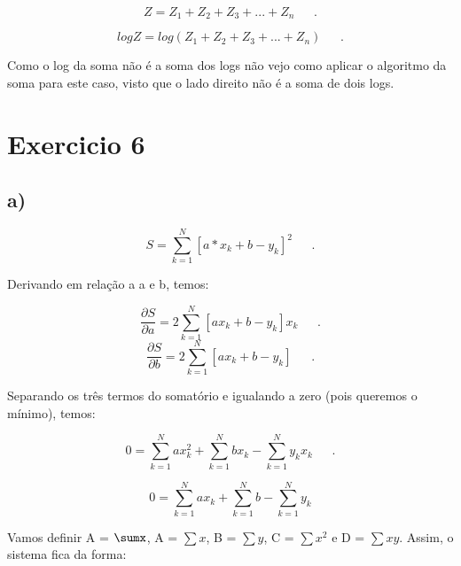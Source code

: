 \documentclass[a4wide]{report}
\begin{document}
\begin{equation}
Z = Z_{1} + Z_{2} + Z_{3} + ... + Z_{n}
~~~~~~~.
\label{z}
\end{equation}

\begin{equation}
logZ = log (Z_{1} + Z_{2} + Z_{3} + ... + Z_{n} )
~~~~~~~.
\label{z2}
\end{equation}

Como o log da soma não é a soma dos logs não vejo como aplicar o algoritmo da soma para este caso, visto que o lado direito não é a soma de dois logs.
	
\section*{Exercicio 6}
\subsection*{a)}

\begin{equation}
S = \sum_{k=1}^{N}  [a*x_{k} + b - y_{k}]^2
~~~~~~~.
\label{regressao}
\end{equation}
	
Derivando em relação a a e b, temos:

	\begin{equation}
\frac{\partial S}{\partial a} = 2\sum_{k=1}^{N}  [ax_{k} + b - y_{k}]x_{k}
~~~~~~~.
\label{dsda}
\end{equation}
	\begin{equation}
\frac{\partial S}{\partial b} = 2\sum_{k=1}^{N}  [ax_{k} + b - y_{k}]
~~~~~~~.
\label{dsdb}
\end{equation}	


	
Separando os três termos do somatório e igualando a zero (pois queremos o mínimo), temos:	

	\begin{equation}
0 = \sum_{k=1}^{N} ax_{k}^{2} +\sum_{k=1}^{N} bx_{k} -\sum_{k=1}^{N}  y_{k}x_{k}
~~~~~~~.
\label{dsda0}
\end{equation}	

\begin{equation}
0 = \sum_{k=1}^{N} ax_{k} +\sum_{k=1}^{N} b -\sum_{k=1}^{N}  y_{k}
\label{dsdb0}
\end{equation}	
	
Vamos definir A = $\sumx$, A = $\sum x$, B = $\sum y$, C = $\sum x^{2}$ e D = $\sum xy$. Assim, o sistema fica da forma:
\end{document}
